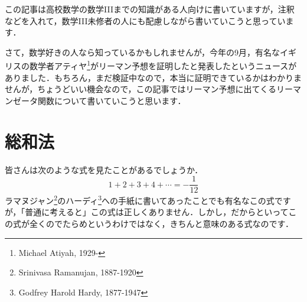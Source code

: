 \documentclass[./main]{subfile}
\begin{document}


この記事は高校数学の数学IIIまでの知識がある人向けに書いていますが，注釈などを入れて，数学III未修者の人にも配慮しながら書いていこうと思っています．

さて，数学好きの人なら知っているかもしれませんが，今年の9月，有名なイギリスの数学者アティヤ\footnote{Michael Atiyah, 1929-}がリーマン予想を証明したと発表したというニュースがありました．もちろん，まだ検証中なので，本当に証明できているかはわかりませんが，ちょうどいい機会なので，この記事ではリーマン予想に出てくるリーマンゼータ関数について書いていこうと思います．

\section{総和法}

皆さんは次のような式を見たことがあるでしょうか．
\begin{equation}\label{zeta-1}
1+2+3+4+\cdots=-\frac{1}{12}
\end{equation}
ラマヌジャン\footnote{Srinivasa Ramanujan, 1887-1920}のハーディ\footnote{Godfrey Harold Hardy, 1877-1947}への手紙に書いてあったことでも有名なこの式ですが，「普通に考えると」この式は正しくありません．しかし，だからといってこの式が全くのでたらめというわけではなく，きちんと意味のある式なのです．
\end{document}

